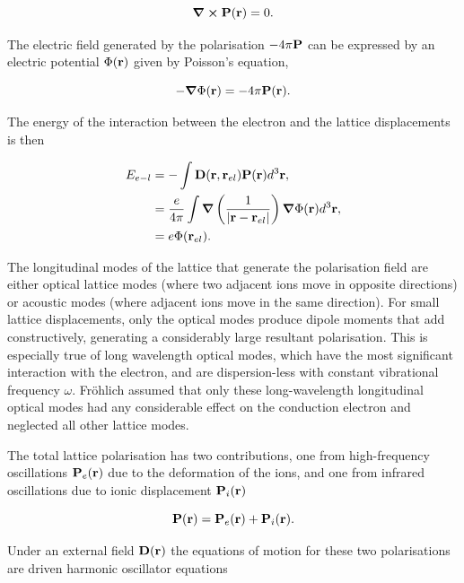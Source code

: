 \begin{equation}
    \curl \vb{P}(\vb{r}) = 0.
\end{equation}

The electric field generated by the polarisation $-4\pi \vb{P}$ can be expressed by an electric potential $\Phi(\vb{r})$ given by Poisson's equation,

\begin{equation}
    -\grad \Phi(\vb{r}) = -4\pi\vb{P}(\vb{r}).
\end{equation}

The energy of the interaction between the electron and the lattice displacements is then

\begin{equation}
    \begin{aligned}
    E_{e-l} &= -\int \vb{D}(\vb{r}, \vb{r}_{el}) \vb{P}(\vb{r}) d^3 \vb{r}, \\ 
    &= \frac{e}{4\pi} \int \grad \left( \frac{1}{\abs{\vb{r} - \vb{r}_{el}}} \right) \grad \Phi(\vb{r}) d^3 \vb{r}, \\
    &= e\Phi(\vb{r}_{el}).
    \end{aligned}
\end{equation}

The longitudinal modes of the lattice that generate the polarisation field are either optical lattice modes (where two adjacent ions move in opposite directions) or acoustic modes (where adjacent ions move in the same direction). For small lattice displacements, only the optical modes produce dipole moments that add constructively, generating a considerably large resultant polarisation. This is especially true of long wavelength optical modes, which have the most significant interaction with the electron, and are dispersion-less with constant vibrational frequency $\omega$. Fr\"ohlich assumed that only these long-wavelength longitudinal optical modes had any considerable effect on the conduction electron and neglected all other lattice modes. 

The total lattice polarisation has two contributions, one from high-frequency oscillations $\vb{P}_{e}(\vb{r})$ due to the deformation of the ions, and one from infrared oscillations due to ionic displacement $\vb{P}_{i}(\vb{r})$

\begin{equation}
    \vb{P}(\vb{r}) = \vb{P}_{e}(\vb{r}) + \vb{P}_{i}(\vb{r}).
\end{equation}

Under an external field $\vb{D}(\vb{r})$ the equations of motion for these two polarisations are driven harmonic oscillator equations

